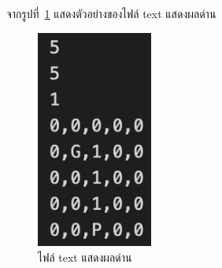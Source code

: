 จากรูปที่~\ref{ft1} แสดงตัวอย่างของไฟล์ text แสดงผลด่าน
\begin{figure}[h!]
    \begin{center}
    \includegraphics[width=1.5in]{pic-toro/filetext1.png}
    \end{center}
    \caption[ไฟล์ text แสดงผลด่าน]{ไฟล์ text แสดงผลด่าน}
    \label{ft1}
    \end{figure}


